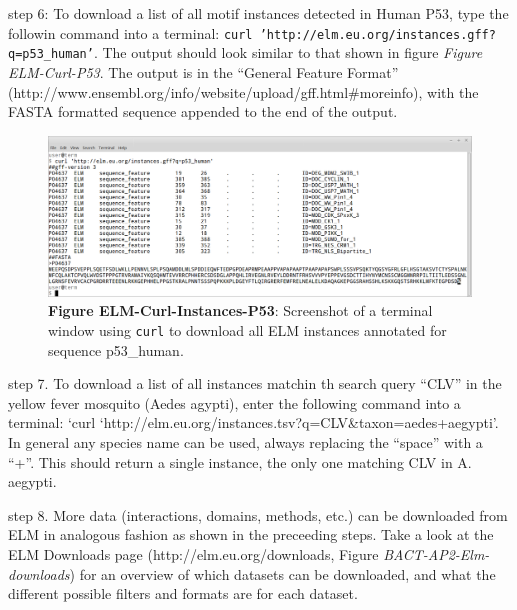 
step 6: To download a list of all motif instances detected in Human P53,
type the followin command into a terminal:
\texttt{curl 'http://elm.eu.org/instances.gff?q=p53\_human'}. The output
should look similar to that shown in figure \emph{Figure ELM-Curl-P53}.
The output is in the ``General Feature Format''
(http://www.ensembl.org/info/website/upload/gff.html\#moreinfo), with
the FASTA formatted sequence appended to the end of the output.


\begin{figure}[h!]
\centering
\includegraphics[width=\textwidth]{Figures/BACT_2/elm_curl_instances_p53_human.png}
\caption{
\textbf{Figure ELM-Curl-Instances-P53}: Screenshot of a terminal window
using \texttt{curl} to download all ELM instances annotated for sequence
p53\_human.
}
\end{figure}

step 7. To download a list of all instances matchin th search query
``CLV'' in the yellow fever mosquito (Aedes agypti), enter the following
command into a terminal: `curl
`http://elm.eu.org/instances.tsv?q=CLV\&taxon=aedes+aegypti'. In general
any species name can be used, always replacing the ``space'' with a
``+''. This should return a single instance, the only one matching CLV
in A. aegypti.

step 8. More data (interactions, domains, methods, etc.) can be
downloaded from ELM in analogous fashion as shown in the preceeding
steps. Take a look at the ELM Downloads page
(http://elm.eu.org/downloads, Figure \emph{BACT-AP2-Elm-downloads}) for
an overview of which datasets can be downloaded, and what the different
possible filters and formats are for each dataset.

